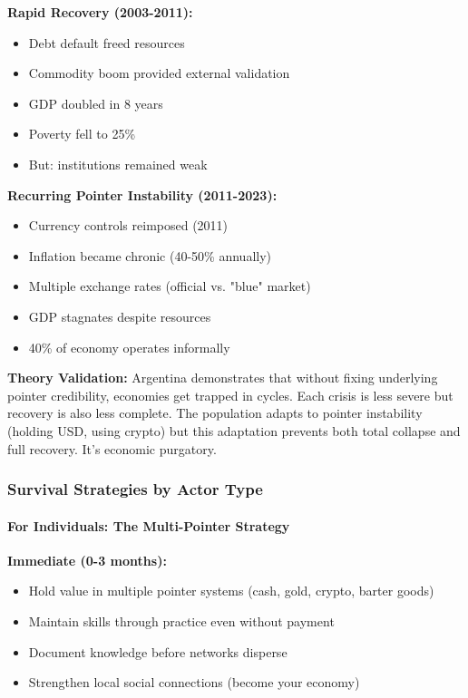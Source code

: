 \documentclass[11pt,oneside]{book}
\begin{document}
\textbf{Rapid Recovery (2003-2011):}
\begin{itemize}
\item Debt default freed resources
\item Commodity boom provided external validation
\item GDP doubled in 8 years
\item Poverty fell to 25\%
\item But: institutions remained weak
\end{itemize}

\textbf{Recurring Pointer Instability (2011-2023):}
\begin{itemize}
\item Currency controls reimposed (2011)
\item Inflation became chronic (40-50\% annually)
\item Multiple exchange rates (official vs. "blue" market)
\item GDP stagnates despite resources
\item 40\% of economy operates informally
\end{itemize}

\textbf{Theory Validation:} Argentina demonstrates that without fixing underlying pointer credibility, economies get trapped in cycles. Each crisis is less severe but recovery is also less complete. The population adapts to pointer instability (holding USD, using crypto) but this adaptation prevents both total collapse and full recovery. It's economic purgatory.

\subsubsection{Survival Strategies by Actor Type}

\paragraph{For Individuals: The Multi-Pointer Strategy}

\textbf{Immediate (0-3 months):}
\begin{itemize}
\item Hold value in multiple pointer systems (cash, gold, crypto, barter goods)
\item Maintain skills through practice even without payment
\item Document knowledge before networks disperse
\item Strengthen local social connections (become your economy)
\end{itemize}
\end{document}
